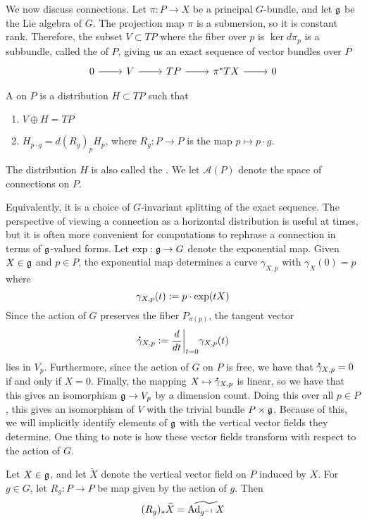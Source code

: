 We now discuss connections. Let $\pi : P \to X$ be a principal $G$-bundle, and
let $\mathfrak{g}$ be the Lie algebra of $G$. The projection map $\pi$ is a submersion,
so it is constant rank. Therefore, the subset $V \subset TP$ where the fiber
over $p$ is $\ker d\pi_p$ is a subbundle, called the 
of $P$, giving us an exact sequence of vector bundles over $P$
\[\begin{tikzcd}
0 \ar[r] & V \ar[r] & TP \ar[r] & \pi^*TX \ar[r] & 0
\end{tikzcd}\]
%
\begin{defn}
A  on $P$ is a distribution $H \subset TP$ such that
\begin{enumerate}
  \item $V \oplus H = TP$
  \item $H_{p \cdot g} = d(R_g)_pH_p$, where $R_g : P \to P$ is the map
  $p \mapsto p\cdot g$.
\end{enumerate}
The distribution $H$ is also called the .
We let $\mathscr{A}(P)$ denote the space of connections on $P$.
\end{defn}
%
Equivalently, it is a choice of $G$-invariant splitting of the exact sequence.
The perspective of viewing a connection as a horizontal distribution is useful
at times, but it is often more convenient for computations to rephrase a connection
in terms of $\mathfrak{g}$-valued forms. Let $\exp : \mathfrak{g} \to G$ denote the exponential map.
Given $X \in \mathfrak{g}$ and $p \in P$, the exponential map determines a curve
$\gamma_{X,p}$ with $\gamma_X(0) = p$ where
\[
\gamma_{X,p}(t) \vcentcolon= p \cdot \mathrm{exp}(tX)
\]
Since the action of $G$ preserves the fiber $P_{\pi(p)}$, the tangent vector
\[
\accentset{\mbox{\large\bfseries .}}{\gamma}_{X,p} \vcentcolon= \frac{d}{dt}\bigg\vert_{t=0} \gamma_{X,p}(t)
\]
lies in $V_p$. Furthermore, since the action of $G$ on $P$ is free,
we have that $\accentset{\mbox{\large\bfseries .}}{\gamma}_{X,p} = 0$ if and only if $X = 0$. Finally,
the mapping $X \mapsto \accentset{\mbox{\large\bfseries .}}{\gamma}_{X,p}$ is linear, so we have that this
gives an isomorphism $\mathfrak{g} \to V_p$ by a dimension count. Doing this
over all $p \in P$, this gives an isomorphism of $V$ with the trivial bundle
$P \times \mathfrak{g}$. Because of this, we will implicitly identify elements of
$\mathfrak{g}$ with the vertical vector fields they determine. One thing to note
is how these vector fields transform with respect to the action of $G$.
%
\begin{prop}
Let $X \in \mathfrak{g}$, and let $\widetilde{X}$ denote the vertical vector field on $P$
induced by $X$. For $g \in G$, let $R_g : P \to P$ be map given by the action of $g$.
Then
\[
(R_g)_*\widetilde{X} = \widetilde{\operatorname{Ad}_{g^{-1}}X}
\]
\end{prop}
